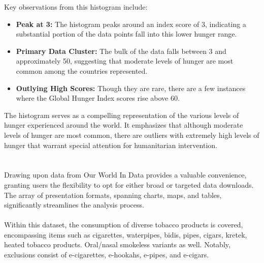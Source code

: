                 Key observations from this histogram include:

                \begin{itemize}
                        \item \textbf{Peak at 3:} The histogram peaks around an index score of 3, indicating a substantial portion of the data points fall into this lower hunger range.

                        \item \textbf{Primary Data Cluster:} The bulk of the data falls between 3 and approximately 50, suggesting that moderate levels of hunger are most common among the countries represented.

                        \item \textbf{Outlying High Scores:} Though they are rare, there are a few instances where the Global Hunger Index scores rise above 60.
                \end{itemize}

                The histogram serves as a compelling representation of the various levels of hunger experienced around the world. It emphasizes that although moderate levels of hunger are most common, there are outliers with extremely high levels of hunger that warrant special attention for humanitarian intervention.


    \section{\dsSmoking}

        \subsection{\duCollectInitialData}

            Drawing upon data from Our World In Data provides a valuable convenience, granting users the flexibility to opt for either broad or targeted data downloads. The array of presentation formats, spanning charts, maps, and tables, significantly streamlines the analysis process.
            \\
            \\
            Within this dataset, the consumption of diverse tobacco products is covered, encompassing items such as cigarettes, waterpipes, bidis, pipes, cigars, kretek, heated tobacco products. Oral/nasal smokeless variants as well. Notably, exclusions consist of e-cigarettes, e-hookahs, e-pipes, and e-cigars.

